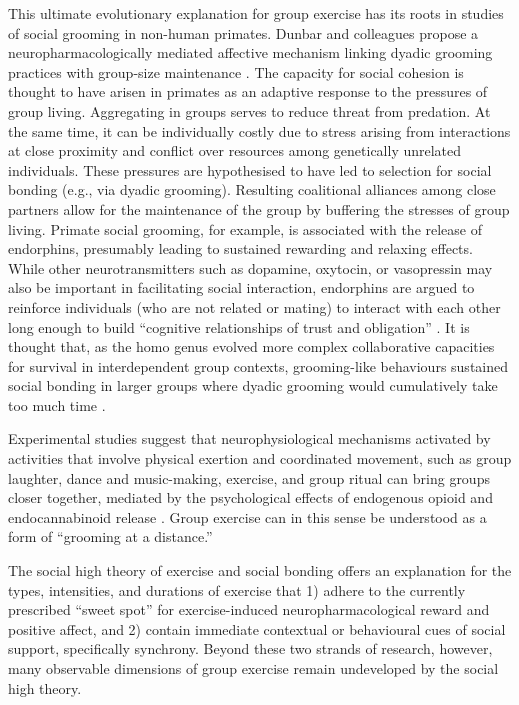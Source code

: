 \begin{CJK}{UTF8}{gbsn}
This ultimate evolutionary explanation for group exercise has its roots in studies of social grooming in non-human primates. Dunbar and colleagues propose a neuropharmacologically mediated affective mechanism linking dyadic grooming practices with group-size maintenance \citep{Machin2011}.  The capacity for social cohesion is thought to have arisen in primates as an adaptive response to the pressures of group living.  Aggregating in groups serves to reduce threat from predation.  At the same time, it can be individually costly due to stress arising from interactions at close proximity and conflict over resources among genetically unrelated individuals.  These pressures are hypothesised to have led to selection for social bonding (e.g., via dyadic grooming).  Resulting coalitional alliances among close partners allow for the maintenance of the group by buffering the stresses of group living.  Primate social grooming, for example, is associated with the release of endorphins, presumably leading to sustained rewarding and relaxing effects.  While other neurotransmitters such as dopamine, oxytocin, or vasopressin may also be important in facilitating social interaction, endorphins are argued to reinforce individuals (who are not related or mating) to interact with each other long enough to build ``cognitive relationships of trust and obligation'' \citep[1839]{Dunbar2012}.  It is thought that, as the homo genus evolved more complex collaborative capacities for survival in interdependent group contexts, grooming-like behaviours sustained social bonding in larger groups where dyadic grooming would cumulatively take too much time \citep{Dunbar2012}.

Experimental studies suggest that neurophysiological mechanisms activated by activities that involve physical exertion and coordinated movement, such as group laughter, dance and music-making, exercise, and group ritual can bring groups closer together, mediated by the psychological effects of endogenous opioid and endocannabinoid release \citep{Cohen2009,Fischer2014a,Fischer2014,Sullivan2014,Tarr2016,Tarr2015}.  Group exercise can in this sense be understood as a form of ``grooming at a distance.''

The social high theory of exercise and social bonding offers an explanation for the types, intensities, and durations of exercise that 1) adhere to the currently prescribed ``sweet spot'' for exercise-induced neuropharmacological reward and positive affect, and 2) contain immediate contextual or behavioural cues of social support, specifically synchrony.  Beyond these two strands of research, however, many observable dimensions of group exercise remain undeveloped by the social high theory.


\end{CJK}
